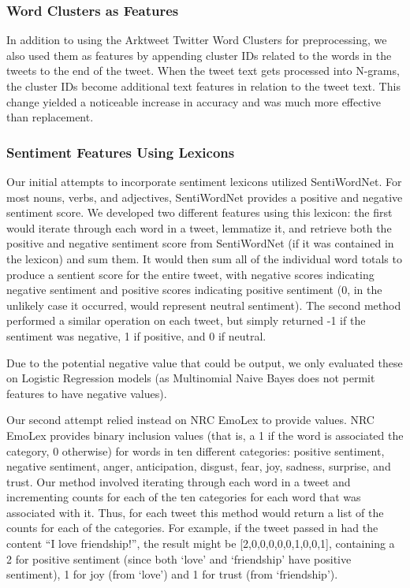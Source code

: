 \documentclass[11pt]{article}
\begin{document}
\subsubsection{Word Clusters as Features}
In addition to using the Arktweet Twitter Word Clusters for preprocessing, we also used them as features by appending cluster IDs related to the words in the tweets to the end of the tweet. When the tweet text gets processed into N-grams, the cluster IDs become additional text features in relation to the tweet text. This change yielded a noticeable increase in accuracy and was much more effective than replacement.

\subsubsection{Sentiment Features Using Lexicons}
Our initial attempts to incorporate sentiment lexicons utilized SentiWordNet. For most nouns, verbs, and adjectives, SentiWordNet provides a positive and negative sentiment score. We developed two different features using this lexicon: the first would iterate through each word in a tweet, lemmatize it, and retrieve both the positive and negative sentiment score from SentiWordNet (if it was contained in the lexicon) and sum them. It would then sum all of the individual word totals to produce a sentient score for the entire tweet, with negative scores indicating negative sentiment and positive scores indicating positive sentiment (0, in the unlikely case it occurred, would represent neutral sentiment). The second method performed a similar operation on each tweet, but simply returned -1 if the sentiment was negative, 1 if positive, and 0 if neutral.

Due to the potential negative value that could be output, we only evaluated these on Logistic Regression models (as Multinomial Naive Bayes does not permit features to have negative values).

Our second attempt relied instead on NRC EmoLex to provide values. NRC EmoLex provides binary inclusion values (that is, a 1 if the word is associated the category, 0 otherwise) for words in ten different categories: positive sentiment, negative sentiment, anger, anticipation, disgust, fear, joy, sadness, surprise, and trust. Our method involved iterating through each word in a tweet and incrementing counts for each of the ten categories for each word that was associated with it. Thus, for each tweet this method would return a list of the counts for each of the categories. For example, if the tweet passed in had the content ``I love friendship!'', the result might be [2,0,0,0,0,0,1,0,0,1], containing a 2 for positive sentiment (since both `love' and `friendship' have positive sentiment), 1 for joy (from `love') and 1 for trust (from `friendship').
\end{document}

